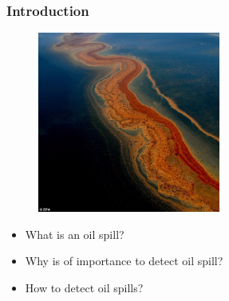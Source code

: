 \documentclass{beamer}
\begin{document}
\begin{frame}
\frametitle{Introduction}
\begin{minipage}[h]{0.33\textwidth}
\begin{figure}
	\centering
    \includegraphics[width=60mm,scale=1]{./img/mex.jpg}
\end{figure}
\end{minipage}

\begin{minipage}[h]{0.33\textwidth}
\begin{itemize}
	\item What is an oil spill?
	\item Why is of importance to detect oil spill? %
	\item How to detect oil spills? %
	
	
\end{itemize}
\end{minipage}

\end{frame}
\end{document}
